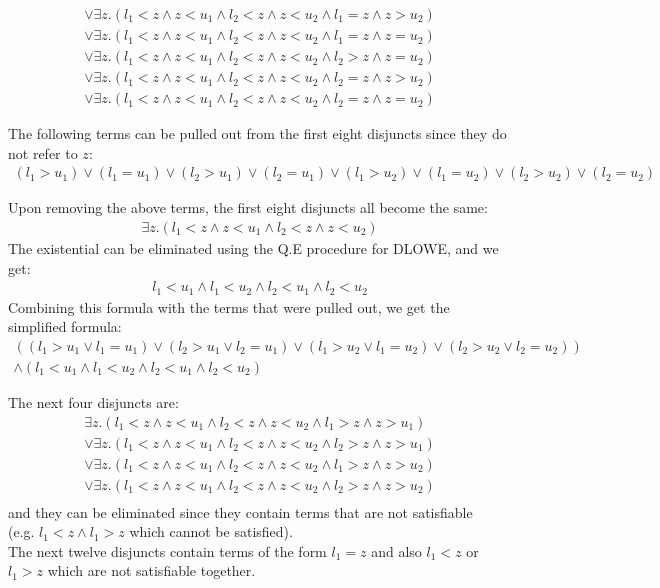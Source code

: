 \documentclass[12pt,letterpaper, onecolumn]{exam}
\begin{document}
\begin{questions}
\begin{align*}
		\lor \exists z. ( l_1 < z \land z < u_1 \land l_2 < z \land z < u_2 \land l_1 = z \land z > u_2 ) \\
		\lor \exists z. ( l_1 < z \land z < u_1 \land l_2 < z \land z < u_2 \land l_1 = z \land z = u_2 ) \\
		\lor \exists z. ( l_1 < z \land z < u_1 \land l_2 < z \land z < u_2 \land l_2 > z \land z = u_2 ) \\
		\lor \exists z. ( l_1 < z \land z < u_1 \land l_2 < z \land z < u_2 \land l_2 = z \land z > u_2 ) \\
		\lor \exists z. ( l_1 < z \land z < u_1 \land l_2 < z \land z < u_2 \land l_2 = z \land z = u_2 )
	\end{align*}

	The following terms can be pulled out from the first eight disjuncts since they do not refer to $ z $:
	\begin{align*}
		(l_1 > u_1) \lor (l_1 = u_1) \lor (l_2 > u_1) \lor (l_2 = u_1) \lor (l_1 > u_2) \lor (l_1 = u_2) \lor (l_2 > u_2) \lor (l_2 = u_2)
	\end{align*}

	Upon removing the above terms, the first eight disjuncts all become the same:
	\begin{align*}
		\exists z. ( l_1 < z \land z < u_1 \land l_2 < z \land z < u_2 )
	\end{align*}
	The existential can be eliminated using the Q.E procedure for DLOWE, and we get:
	\begin{align*}
		l_1 < u_1 \land l_1 < u_2 \land l_2 < u_1 \land l_2 < u_2
	\end{align*}
	Combining this formula with the terms that were pulled out, we get the simplified formula:
	\begin{align*}
		((l_1 > u_1 \lor l_1 = u_1) \lor (l_2 > u_1 \lor l_2 = u_1) \lor (l_1 > u_2 \lor l_1 = u_2) \lor (l_2 > u_2 \lor l_2 = u_2)) \\
		\land (l_1 < u_1 \land l_1 < u_2 \land l_2 < u_1 \land l_2 < u_2)
	\end{align*}

	The next four disjuncts are:
	\begin{align*}
		\exists z. ( l_1 < z \land z < u_1 \land l_2 < z \land z < u_2 \land l_1 > z \land z > u_1 ) \\
		\lor \exists z. ( l_1 < z \land z < u_1 \land l_2 < z \land z < u_2 \land l_2 > z \land z > u_1 ) \\
		\lor \exists z. ( l_1 < z \land z < u_1 \land l_2 < z \land z < u_2 \land l_1 > z \land z > u_2 ) \\
		\lor \exists z. ( l_1 < z \land z < u_1 \land l_2 < z \land z < u_2 \land l_2 > z \land z > u_2 ) \\
	\end{align*}
	and they can be eliminated since they contain terms that are not satisfiable \\
	(e.g. $ l_1 < z \land l_1 > z $ which cannot be satisfied). \\
	The next twelve disjuncts contain terms of the form $ l_1 = z $ and also $ l_1 < z $ or $ l_1 > z $ which are not satisfiable together. \\
	

\end{questions}
\end{document}

